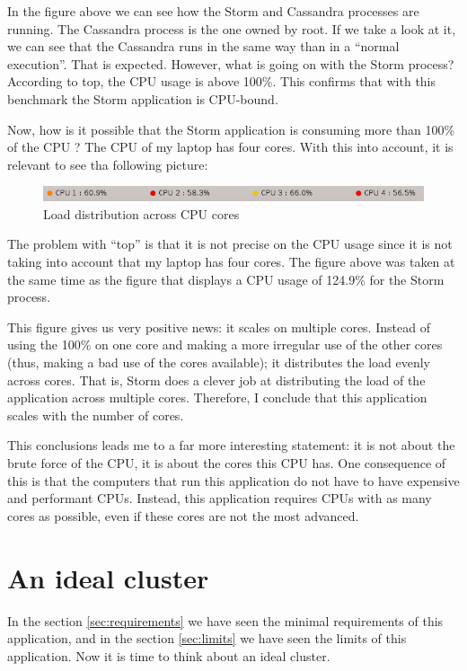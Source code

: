 In the figure above we can see how the Storm and Cassandra processes are
running. The Cassandra process is the one owned by root. If we take a look at
it, we can see that the Cassandra runs in the same way than in a ``normal
execution''. That is expected. However, what is going on with the Storm
process? According to top, the CPU usage is above 100\%. This confirms that
with this benchmark the Storm application is CPU-bound.

Now, how is it possible that the Storm application is consuming more than 100\%
of the CPU ? The CPU of my laptop has four cores. With this into account, it is
relevant to see tha following picture:

\begin{figure}[H]
  \centering
  \includegraphics[scale=0.9]{hardware/images/cores.png}
  \caption{Load distribution across CPU cores}\label{fig:cpus}
\end{figure}

The problem with ``top'' is that it is not precise on the CPU usage since it is
not taking into account that my laptop has four cores. The figure above was
taken at the same time as the figure that displays a CPU usage of 124.9\% for
the Storm process.

This figure gives us very positive news: it scales on multiple cores. Instead
of using the 100\% on one core and making a more irregular use of the other
cores (thus, making a bad use of the cores available); it distributes the load
evenly across cores. That is, Storm does a clever job at distributing the load
of the application across multiple cores. Therefore, I conclude that this
application scales with the number of cores.

This conclusions leads me to a far more interesting statement: it is not about
the brute force of the CPU, it is about the cores this CPU has. One consequence
of this is that the computers that run this application do not have to have
expensive and performant CPUs. Instead, this application requires CPUs with as
many cores as possible, even if these cores are not the most advanced.

\section{An ideal cluster}

In the section \ref{sec:requirements} we have seen the minimal requirements of
this application, and in the section \ref{sec:limits} we have seen the limits
of this application. Now it is time to think about an ideal cluster.

